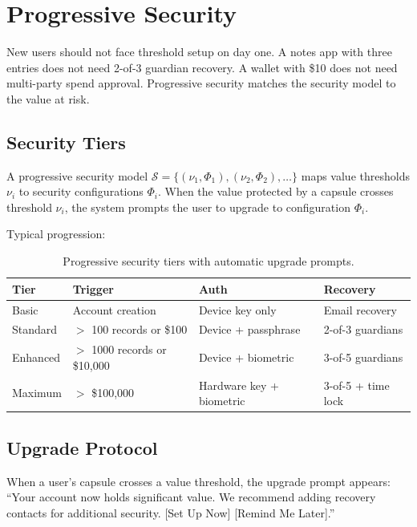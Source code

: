 \section{Progressive Security}
\label{sec:progressive}

New users should not face threshold setup on day one. A notes app with three
entries does not need 2-of-3 guardian recovery. A wallet with \$10 does not
need multi-party spend approval. Progressive security matches the security
model to the value at risk.

\subsection{Security Tiers}

\begin{definition}
A progressive security model $\mathcal{S} = \{(\nu_1, \Phi_1), (\nu_2, \Phi_2), \ldots\}$
maps value thresholds $\nu_i$ to security configurations $\Phi_i$. When the
value protected by a capsule crosses threshold $\nu_i$, the system prompts
the user to upgrade to configuration $\Phi_i$.
\end{definition}

Typical progression:

\begin{table}[H]
\centering
\caption{Progressive security tiers with automatic upgrade prompts.}
\label{tab:progressive}
\begin{tabular}{llll}
\toprule
\textbf{Tier} & \textbf{Trigger} & \textbf{Auth} & \textbf{Recovery} \\
\midrule
Basic & Account creation & Device key only & Email recovery \\
Standard & $>$ 100 records or \$100 & Device + passphrase & 2-of-3 guardians \\
Enhanced & $>$ 1000 records or \$10,000 & Device + biometric & 3-of-5 guardians \\
Maximum & $>$ \$100,000 & Hardware key + biometric & 3-of-5 + time lock \\
\bottomrule
\end{tabular}
\end{table}

\subsection{Upgrade Protocol}

When a user's capsule crosses a value threshold, the upgrade prompt appears:
``Your account now holds significant value. We recommend adding recovery
contacts for additional security. [Set Up Now] [Remind Me Later].''

